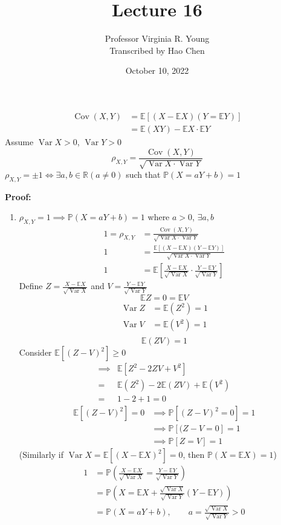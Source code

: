 \documentclass[a4paper]{article}
\title{Lecture 16}
\author{Professor Virginia R. Young\\ \small{Transcribed by Hao Chen}}
\date{October 10, 2022}
\newcommand{\n}{\hfill\break}
\newcommand{\pf}[1]{\par\noindent\settowidth{\hangindent}{\textbf{Proof: }}\textbf{Proof: }#1\n}
\newcommand{\reals}{\mathbb{R}}
\newcommand{\R}{\reals}
\newcommand{\Prob}{\mathbb{P}}
\renewcommand{\P}{\Prob}
\newcommand{\Avg}{\mathbb{E}}
\newcommand{\E}{\Avg}
\DeclareMathOperator{\Var}{Var}
\DeclareMathOperator{\Cov}{Cov}
\begin{document}
\maketitle

\begin{align*}
    \Cov(X,Y)&=\E[(X-\E X)(Y=\E Y)] \\
    &=\E(XY)-\E X\cdot \E Y
\end{align*}
Assume $\Var X>0$, $\Var Y>0$
\[\rho_{X,Y}=\frac{\Cov(X,Y)}{\sqrt{\Var X\cdot\Var Y}}\]
$\rho_{X,Y}=\pm1\iff \exists a, b\in\R(a\neq0)$ such that $\P(X=aY+b)=1$

\pf{
    \begin{enumerate}
        \item $\rho_{X,Y}=1\implies\P(X=aY+b)=1$ where $a>0$, $\exists a, b$
        \begin{align*}
            1=\rho_{X,Y}&=\frac{\Cov(X,Y)}{\sqrt{\Var X\cdot\Var Y}} \\
            1&=\frac{\E[(X-\E X)(Y-\E Y)]}{\sqrt{\Var X\cdot\Var Y}} \\
            1&=\E\left[\frac{X-\E X}{\sqrt{\Var X}}\cdot\frac{Y-\E Y}{\sqrt{\Var Y}}\right]
        \end{align*}
        Define $Z=\frac{X-\E X}{\sqrt{\Var X}}$ and $V=\frac{Y-\E Y}{\sqrt{\Var Y}}$
        \[\E Z=0=\E V\]
        \begin{align*}
            \Var Z&=\E(Z^2)=1 \\
            \Var V&=\E(V^2)=1 \\
        \end{align*}
        \[\E(ZV)=1\]
        Consider $\E[(Z-V)^2]\geq0$
        \begin{align*}
            \implies&\E[Z^2-2ZV+V^2] \\
            =&\E(Z^2)-2\E(ZV)+\E(V^2) \\
            =&1-2+1=0
        \end{align*}
        \begin{align*}
            \E[(Z-V)^2]=0&\implies\P[(Z-V)^2=0]=1 \\
            &\implies\P[(Z-V=0]=1 \\
            &\implies\P[Z=V]=1
        \end{align*}
        (Similarly if $\Var X=\E[(X-\E X)^2]=0$, then $\P(X=\E X)=1$)
        \begin{align*}
            1&=\P\left(\frac{X-\E X}{\sqrt{\Var X}}=\frac{Y-\E Y}{\sqrt{\Var Y}}\right) \\
            &=\P\left(X=\E X+\frac{\sqrt{\Var X}}{\sqrt{\Var Y}}(Y-\E Y)\right) \\
            &=\P(X=aY+b), \qquad a=\frac{\sqrt{\Var X}}{\sqrt{\Var Y}}>0
        \end{align*}
        

\end{enumerate}}
\end{document}
